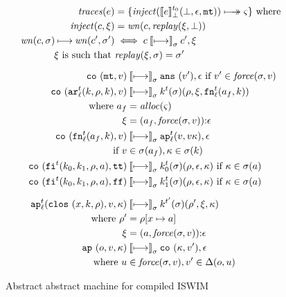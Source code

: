 \documentclass[preprint,onecolumn,9pt]{sigplanconf} %
\begin{document}
\begin{figure}
\small
\begin{gather*}
\begin{align*}
\traces(\mexp) &= \setof{ \inject(\compile{\mexp}^\mtcntr_\bot(\bot,\epsilon,\kmt)) \multimachstep \mstate}
                    \text{ where } \\
\inject(c,\msdiff) &= \wn(c,\replay(\msdiff,\bot)) \\
\wn(c,\msto) \machstep \wn(c',\msto') &\iff c \cmachstep_\msto c',\msdiff \\
\msdiff \text{ is such that } &\replay(\msdiff,\msto) = \msto'
\end{align*}
\\[2mm]
\begin{align*}
\co{\kmt,\mval} &\cmachstep_\msto
\ans{\mval'},\epsilon \text{ if } \mval' \in \spchoice{\force(\msto,\mval)}{\force(\mval)}
\\
\co{\kar[^\mcntr_\mlab]{\mcomp,\menv,\mkaddr},\mval} & \cmachstep_\msto
\mcomp^\mcntr(\msto)(\menv,\msdiff,\kfn[^\mcntr_\mlab]{\maddr_f,\mkaddr}) \\
\text{ where } \maddr_f &= \alloc(\mstate) \\
               \msdiff &= \cons{\ttuple{\maddr_f}{\force(\msto,\mval)}}{\epsilon}
\\
\co{\kfn[^\mcntr_\mlab]{\maddr_f,\mkaddr},\mval} & \cmachstep_\msto
\ap[^\mcntr_\mlab]{\mval,\mval\mkont},\epsilon \\
\text{ if }\mval &\in \msto(\maddr_f), \mkont \in \msto(\mkaddr)
\\
\co{\kif[^\mcntr]{\mcompi0,\mcompi1,\menv,\maddr},\strue} & \cmachstep_\msto
\mcompi{0}^\mcntr(\msto)(\menv,\epsilon,\mkont)
\text{ if }\mkont\in\msto(\maddr)
\\
\co{\kif[^\mcntr]{\mcompi0,\mcompi1,\menv,\maddr},\sfalse} & \cmachstep_\msto
\mcompi{1}^\mcntr(\msto)(\menv,\epsilon,\mkont)
\text{ if }\mkont\in\msto(\maddr)
\\[2mm]
\ap[^\mcntr_\mlab]{\clos{\mvar,\mcomp,\menv},\mval,\mkont} & \cmachstep_\msto
\mcomp^{\mcntr'}(\msto)(\menv',\msdiff,\mkont) \\
\text{ where }\menv' &= \menv[\mvar\mapsto\maddr] \\
              \msdiff &= \cons{\ttuple{\maddr}{\force(\msto,\mval)}}{\epsilon}
\\
\ap{\mop,\mval,\mkont} & \cmachstep_\msto
\co{\mkont,\mval'},\epsilon \\
\text{ where } \mvalx{u} &\in \spchoice{\force(\msto,\mval)}{\force(\mval)}, \mval'\in\interpdelta(\mop,\mvalx{u})
\end{align*}
\end{gather*}
\caption{Abstract abstract machine for compiled ISWIM}
\label{fig:caam}
\end{figure}
\end{document}
